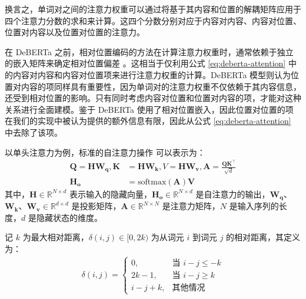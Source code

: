 换言之，单词对之间的注意力权重可以通过将基于其内容和位置的解耦矩阵应用于四个注意力分数的求和来计算。这四个分数分别对应于内容对内容、内容对位置、位置对内容以及位置对位置的注意力。

在 DeBERTa 之前，相对位置编码的方法在计算注意力权重时，通常依赖于独立的嵌入矩阵来确定相对位置偏差 \cite{Shaw2018SelfAttentionWR, Huang2018MusicTG}。这相当于仅利用公式 \ref{eq:deberta-attention} 中的内容对内容和内容对位置项来进行注意力权重的计算。DeBERTa 模型则认为位置对内容的项同样具有重要性，因为单词对的注意力权重不仅依赖于其内容信息，还受到相对位置的影响。只有同时考虑内容对位置和位置对内容的项，才能对这种关系进行全面建模。鉴于 DeBERTa 使用了相对位置嵌入，因此位置对位置的项在我们的实现中被认为提供的额外信息有限，因此从公式 \ref{eq:deberta-attention} 中去除了该项。

以单头注意力为例，标准的自注意力操作 \cite{transformer} 可以表示为：
\begin{align}
\mathbf{Q} = \mathbf{HW_{q}}, \mathbf{K} &= \mathbf{HW_{k}}, V = \mathbf{HW_{v}}, \mathbf{A} = \frac{\mathbf{QK}^{\intercal}}{\sqrt{d}} \\
\mathbf{H_{o}} &= \text{softmax}(\mathbf{A})\mathbf{V}
\label{eq:transformer-attention1}
\end{align}
其中，$\mathbf{H} \in \mathbb{R}^{N×d}$ 表示输入的隐藏向量，$\mathbf{H_{o}} \in \mathbb{R}^{N×d}$ 是自注意力的输出，$\mathbf{W_{q}}$、$\mathbf{W_{k}}$、$\mathbf{W_{v}} \in \mathbb{R}^{d×d}$ 是投影矩阵，$\mathbf{A} \in \mathbb{R}^{N×N}$ 是注意力矩阵，$N$ 是输入序列的长度，$d$ 是隐藏状态的维度。

记 $k$ 为最大相对距离，$\delta(i, j) \in [0, 2k)$ 为从词元 $i$ 到词元 $j$ 的相对距离，其定义为：
\begin{align}
\delta(i, j)=\begin{cases}
0, & \text{当~} i - j \leq -k \\
2k - 1, & \text{当~} i - j \geq k \\
i - j + k, & \text{其他情况}
\end{cases}
\label{eq:deberta-distance}
\end{align}

